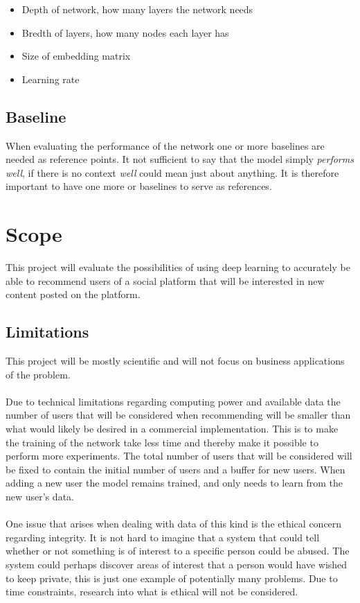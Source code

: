 \begin{itemize}
    \item Depth of network, how many layers the network needs
    \item Bredth of layers, how many nodes each layer has
    \item Size of embedding matrix
    \item Learning rate
\end{itemize}

\subsection{Baseline}
When evaluating the performance of the network one or more baselines are needed as reference points. It not sufficient to say that the model simply \textit{performs well}, if there is no context \textit{well} could mean just about anything. It is therefore important to have one more or baselines to serve as references.

\section{Scope}
This project will evaluate the possibilities of using deep learning to accurately be able to recommend users of a social platform that will be interested in new content posted on the platform.

\subsection{Limitations}
This project will be mostly scientific and will not focus on business applications of the problem.
\\\\
Due  to  technical  limitations  regarding  computing  power  and  available  data  the number of users that will be considered when recommending will be smaller than what would likely be desired in a commercial implementation. This  is  to  make  the  training  of  the  network  take  less  time  and  thereby make it possible to perform more experiments. The total number of users that will be considered will be fixed to contain the initial number of users and a buffer for new users. When adding a new user the model remains trained, and only needs to learn from the new user’s data.
\\\\
One issue that arises when dealing with data of this kind is the ethical concern regarding integrity. It is not hard to imagine that a system that could tell whether or not something is of interest to a specific person could be abused. The system could perhaps discover areas of interest that a person would have wished to keep private, this is just one example of potentially many problems. Due to time constraints, research into what is ethical will not be considered. 